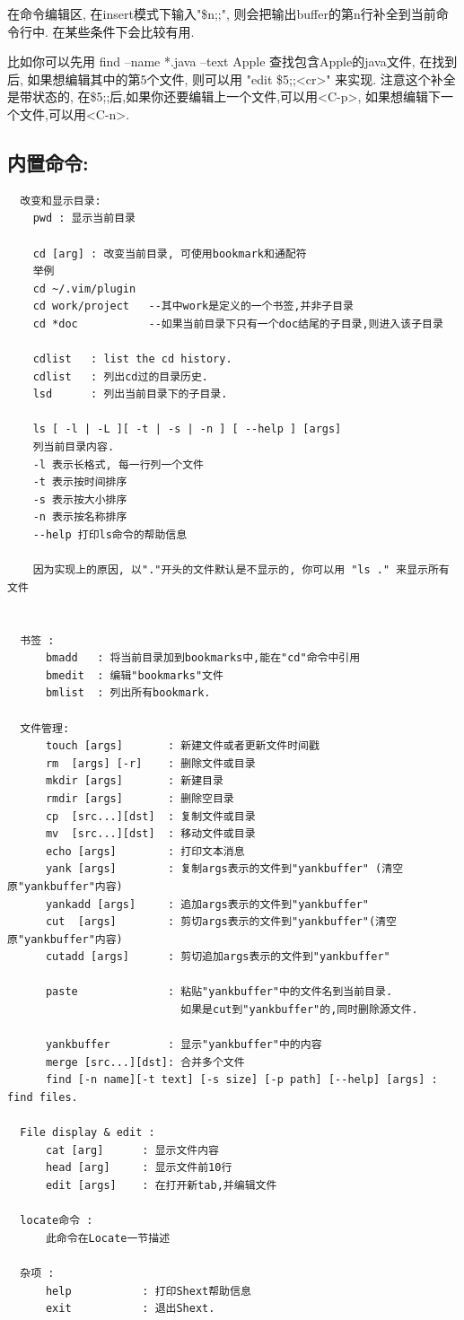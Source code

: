 \documentclass[oneside,openany]{book}
\begin{document}
  在命令编辑区, 在insert模式下输入"\$n;;", 则会把输出buffer的第n行补全到当前命令行中.
在某些条件下会比较有用.

  比如你可以先用 find --name *.java --text Apple 查找包含Apple的java文件, 在找到后,
如果想编辑其中的第5个文件, 则可以用 "edit \$5;;<cr>" 来实现. 注意这个补全是带状态的,
在\$5;;后,如果你还要编辑上一个文件,可以用<C-p>, 如果想编辑下一个文件,可以用<C-n>.

  \subsection{内置命令:}

  \begin{verbatim}
  改变和显示目录:
    pwd : 显示当前目录

    cd [arg] : 改变当前目录, 可使用bookmark和通配符
    举例
    cd ~/.vim/plugin
    cd work/project   --其中work是定义的一个书签,并非子目录
    cd *doc           --如果当前目录下只有一个doc结尾的子目录,则进入该子目录

    cdlist   : list the cd history.
    cdlist   : 列出cd过的目录历史.
    lsd      : 列出当前目录下的子目录.

    ls [ -l | -L ][ -t | -s | -n ] [ --help ] [args] 
    列当前目录内容. 
    -l 表示长格式, 每一行列一个文件
    -t 表示按时间排序
    -s 表示按大小排序
    -n 表示按名称排序
    --help 打印ls命令的帮助信息

    因为实现上的原因, 以"."开头的文件默认是不显示的, 你可以用 "ls ." 来显示所有文件


  书签 :
      bmadd   : 将当前目录加到bookmarks中,能在"cd"命令中引用
      bmedit  : 编辑"bookmarks"文件
      bmlist  : 列出所有bookmark.

  文件管理:
      touch [args]       : 新建文件或者更新文件时间戳
      rm  [args] [-r]    : 删除文件或目录
      mkdir [args]       : 新建目录
      rmdir [args]       : 删除空目录
      cp  [src...][dst]  : 复制文件或目录
      mv  [src...][dst]  : 移动文件或目录
      echo [args]        : 打印文本消息
      yank [args]        : 复制args表示的文件到"yankbuffer" (清空原"yankbuffer"内容)
      yankadd [args]     : 追加args表示的文件到"yankbuffer"
      cut  [args]        : 剪切args表示的文件到"yankbuffer"(清空原"yankbuffer"内容)
      cutadd [args]      : 剪切追加args表示的文件到"yankbuffer"

      paste              : 粘贴"yankbuffer"中的文件名到当前目录.
                           如果是cut到"yankbuffer"的,同时删除源文件.

      yankbuffer         : 显示"yankbuffer"中的内容
      merge [src...][dst]: 合并多个文件
      find [-n name][-t text] [-s size] [-p path] [--help] [args] : find files.

  File display & edit :
      cat [arg]      : 显示文件内容
      head [arg]     : 显示文件前10行
      edit [args]    : 在打开新tab,并编辑文件

  locate命令 :
      此命令在Locate一节描述

  杂项 :
      help           : 打印Shext帮助信息
      exit           : 退出Shext.
  \end{verbatim}
\end{document}
